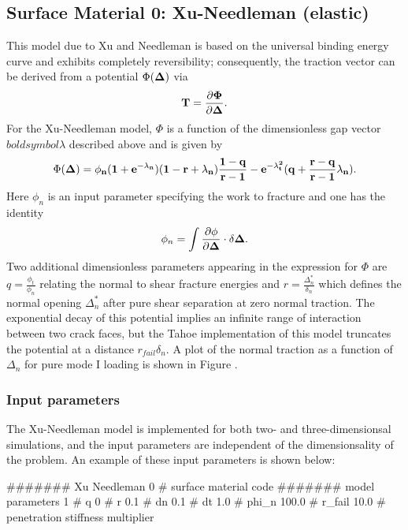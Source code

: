 \subsection{Surface Material 0: Xu-Needleman (elastic)}
\label{sect.material.surface.xu}
This model due to Xu and Needleman \cite{Needleman1994} is based 
on the universal binding energy
curve and exhibits completely reversibility; consequently, the traction vector
can be derived from a potential $\Phi(\bf{\Delta})$ via
\begin{equation}
\bf{T} = \frac{\partial \Phi}{\partial \bf{\Delta}}.
\end{equation}
For the Xu-Needleman model, $\Phi$ is a function of the dimensionless
gap vector $boldsymbol{\lambda}$ described above and is given by 
\begin{equation}
\Phi(\bf{\Delta}) = \phi_n (1+e^{-\lambda_n}) (1-r+\lambda_n)\frac{1-q}{r-1}-e^{-\lambda_t^2} ( q+\frac{r-q}{r-1}\lambda_n ).
\end{equation}
Here $\phi_n$ is an input parameter specifying the work to fracture and one has
the identity
\begin{equation}
\phi_n = \int \frac{\partial \phi}{\partial \bf{\Delta}}\cdot \delta \bf{\Delta}.
\end{equation}
Two additional dimensionless parameters appearing in the expression for
$\Phi$ are $q = \frac{\phi_t}{\phi_n}$
relating the normal to shear fracture energies and $r = \frac{\Delta_n^*}{\delta_n}$
which defines the normal opening $\Delta_n^*$ after pure shear separation at zero
normal traction. The exponential decay of this potential implies an infinite range
of interaction between two crack faces, but the Tahoe implementation of this
model truncates the potential at a distance $r_{fail} \delta_n$. A plot
of the normal traction as a function of $\Delta_n$ for pure mode I loading
is shown in Figure . 

\subsubsection{Input parameters}

The Xu-Needleman model is implemented for both two- and three-dimensionsal
simulations, and the input parameters are independent of the dimensionsality
of the problem.  An example of these input parameters is shown below:
\begin{inputfile}
####### Xu Needleman
0     # surface material code
####### model parameters
1     # q
0     # r
0.1   # dn
0.1   # dt
1.0   # phi_n
100.0 # r_fail
10.0  # penetration stiffness multiplier 
\end{inputfile}

